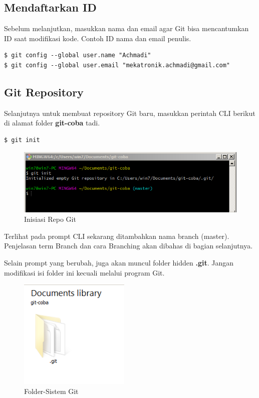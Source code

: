 \documentclass[12pt]{book}
\begin{document}
	\subsection{Mendaftarkan ID}
	
	Sebelum melanjutkan, masukkan nama dan email agar Git bisa mencantumkan ID saat modifikasi kode.
	Contoh ID nama dan email penulis.
	\begin{verbatim}
$ git config --global user.name "Achmadi"
$ git config --global user.email "mekatronik.achmadi@gmail.com"
	\end{verbatim}

	\subsection{Git Repository}
	
	Selanjutnya untuk membuat repository Git baru, masukkan perintah CLI berikut di alamat folder \textbf{git-coba} tadi.
	\begin{verbatim}
$ git init
	\end{verbatim}

	\begin{figure}[!ht]
		\centering
		\includegraphics[width=400pt]{images/git1}
		\caption{Inisiasi Repo Git}
	\end{figure}

	Terlihat pada prompt CLI sekarang ditambahkan nama branch (master).
	Penjelasan term Branch dan cara Branching akan dibahas di bagian selanjutnya.
	
	\newpage
	Selain prompt yang berubah, juga akan muncul folder hidden \textbf{.git}.
	Jangan modifikasi isi folder ini kecuali melalui program Git.
	
	\begin{figure}[!ht]
		\centering
		\includegraphics[width=150pt]{images/git2}
		\caption{Folder-Sistem Git}
	\end{figure}
	
\end{document}
